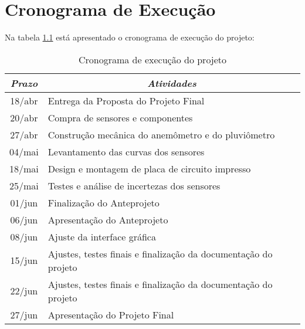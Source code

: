 \documentclass[12pt,a4paper]{instrumentacao}
\begin{document}
\chapter{Cronograma de Execução}

Na tabela \ref{tab:cronograma} está apresentado o cronograma de execução do projeto:

\begin{table}[H]
\centering
\caption{Cronograma de execução do projeto}
\label{tab:cronograma}
\begin{tabular}{|c|l|}
\hline
\textit{\textbf{Prazo}} & \multicolumn{1}{c|}{\textit{\textbf{Atividades}}}               \\ \hline
18/abr                  & Entrega da Proposta do Projeto Final                            \\ \hline
20/abr                  & Compra de sensores e componentes                                \\ \hline
27/abr                  & Construção mecânica do anemômetro e do pluviômetro              \\ \hline
04/mai                  & Levantamento das curvas dos sensores                            \\ \hline
18/mai                  & Design e montagem de placa de circuito impresso                 \\ \hline
25/mai                  & Testes e análise de incertezas dos sensores                     \\ \hline
01/jun                  & Finalização do Anteprojeto                                      \\ \hline
06/jun                  & Apresentação do Anteprojeto                                     \\ \hline
08/jun                  & Ajuste da interface gráfica                                     \\ \hline
15/jun                  & Ajustes, testes finais e finalização da documentação do projeto \\ \hline
22/jun                  & Ajustes, testes finais e finalização da documentação do projeto \\ \hline
27/jun                  & Apresentação do Projeto Final                                   \\ \hline
\end{tabular}
\end{table}
\end{document}
